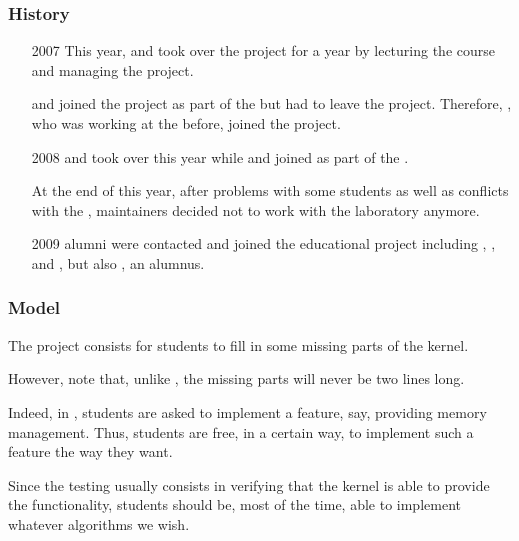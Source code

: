 \begin{frame}
  \frametitle{History}

  \begin{itemize}
    \item[2007]
      This year,  and  took
      over the project for a year by lecturing the course and managing the
      project.

      \-

       and  joined the project
      as part of the  but  had to leave the
      project. Therefore, , who was working at the
       before, joined the project.
    \item[2008]
       and  took over this year
      while  and  joined as part
      of the .

      \-

      At the end of this year, after problems with some students as well as
      conflicts with the ,  maintainers decided not
      to work with the laboratory anymore.
    \item[2009]
       alumni were contacted and joined the educational project
      including , ,
       and ,  but
      also , an  alumnus.
  \end{itemize}
\end{frame}


\begin{frame}
  \frametitle{Model}

  The project consists for students to fill in some missing parts of the
  kernel.

  \-

  However, note that, unlike , the missing parts will never
  be two lines long.

  \-

  Indeed, in , students are asked to implement a feature, say,
  providing memory management. Thus, students are free, in a certain way,
  to implement such a feature the way they want.

  \-

  Since the testing usually consists in verifying that the kernel is able
  to provide the functionality, students should be, most of the time, able
  to implement whatever algorithms \etc{} we wish.
\end{frame}


